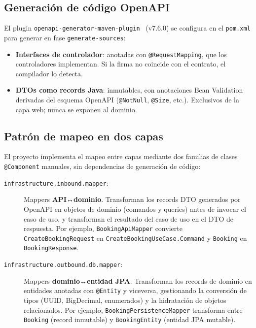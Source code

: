 \subsection{Generación de código OpenAPI}

El plugin \texttt{openapi-generator-maven-plugin}~\cite{openapiGenerator} (v7.6.0) se configura en el
\texttt{pom.xml} para generar en fase \texttt{generate-sources}:

\begin{itemize}
  \item \textbf{Interfaces de controlador}: anotadas con \texttt{@RequestMapping},
    que los controladores implementan. Si la firma no coincide con el contrato,
    el compilador lo detecta.
  \item \textbf{DTOs como records Java}: inmutables, con anotaciones Bean
    Validation derivadas del esquema OpenAPI (\texttt{@NotNull}, \texttt{@Size},
    etc.). Exclusivos de la capa web; nunca se exponen al dominio.
\end{itemize}

\subsection{Patrón de mapeo en dos capas}

El proyecto implementa el mapeo entre capas mediante dos familias de clases
\texttt{@Component} manuales, sin dependencias de generación de código:

\begin{description}
  \item[\texttt{infrastructure.inbound.mapper}:] Mappers \textbf{API↔dominio}.
    Transforman los records DTO generados por OpenAPI en objetos de dominio
    (comandos y queries) antes de invocar el caso de uso, y transforman el
    resultado del caso de uso en el DTO de respuesta. Por ejemplo,
    \texttt{BookingApiMapper} convierte \texttt{CreateBookingRequest} en
    \texttt{CreateBookingUseCase.Command} y \texttt{Booking} en
    \texttt{BookingResponse}.

  \item[\texttt{infra\-structure.out\-bound.db.mapper}:] Mappers
    \textbf{dominio↔entidad JPA}. Transforman los records de dominio en
    entidades anotadas con \texttt{@Entity} y viceversa, gestionando la
    conversión de tipos (UUID, BigDecimal, enumerados) y la hidratación
    de objetos relacionados. Por ejemplo, \texttt{BookingPersistenceMapper}
    transforma entre \texttt{Booking} (record inmutable) y
    \texttt{BookingEntity} (entidad JPA mutable).
\end{description}

